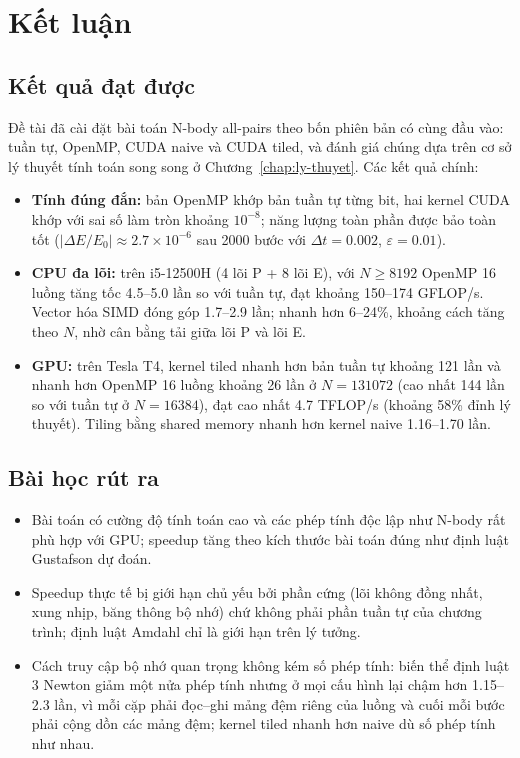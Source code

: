 \chapter*{Kết luận}
\label{chap:ket-luan}

\section*{Kết quả đạt được}

Đề tài đã cài đặt bài toán N-body all-pairs theo bốn phiên bản có cùng đầu vào: tuần tự, OpenMP, CUDA naive và CUDA tiled, và đánh giá chúng dựa trên cơ sở lý thuyết tính toán song song ở Chương~\ref{chap:ly-thuyet}. Các kết quả chính:
\begin{itemize}
\item \textbf{Tính đúng đắn:} bản OpenMP khớp bản tuần tự từng bit, hai kernel CUDA khớp với sai số làm tròn khoảng $10^{-8}$; năng lượng toàn phần được bảo toàn tốt ($|\Delta E/E_0| \approx 2.7\times10^{-6}$ sau 2000 bước với $\Delta t=0.002$, $\varepsilon=0.01$).
\item \textbf{CPU đa lõi:} trên i5-12500H (4 lõi P + 8 lõi E), với $N \ge 8192$ OpenMP 16 luồng tăng tốc 4.5--5.0 lần so với tuần tự, đạt khoảng 150--174 GFLOP/s. Vector hóa SIMD đóng góp 1.7--2.9 lần;  nhanh hơn  6--24\%, khoảng cách tăng theo $N$, nhờ cân bằng tải giữa lõi P và lõi E.
\item \textbf{GPU:} trên Tesla T4, kernel tiled nhanh hơn bản tuần tự khoảng 121 lần và nhanh hơn OpenMP 16 luồng khoảng 26 lần ở $N=131072$ (cao nhất 144 lần so với tuần tự ở $N=16384$), đạt cao nhất 4.7 TFLOP/s (khoảng 58\% đỉnh lý thuyết). Tiling bằng shared memory nhanh hơn kernel naive 1.16--1.70 lần.
\end{itemize}

\section*{Bài học rút ra}

\begin{itemize}
\item Bài toán có cường độ tính toán cao và các phép tính độc lập như N-body rất phù hợp với GPU; speedup tăng theo kích thước bài toán đúng như định luật Gustafson dự đoán.
\item Speedup thực tế bị giới hạn chủ yếu bởi phần cứng (lõi không đồng nhất, xung nhịp, băng thông bộ nhớ) chứ không phải phần tuần tự của chương trình; định luật Amdahl chỉ là giới hạn trên lý tưởng.
\item Cách truy cập bộ nhớ quan trọng không kém số phép tính: biến thể định luật 3 Newton giảm một nửa phép tính nhưng ở mọi cấu hình lại chậm hơn 1.15--2.3 lần, vì mỗi cặp phải đọc--ghi mảng đệm riêng của luồng và cuối mỗi bước phải cộng dồn các mảng đệm; kernel tiled nhanh hơn naive dù số phép tính như nhau.
\end{itemize}

